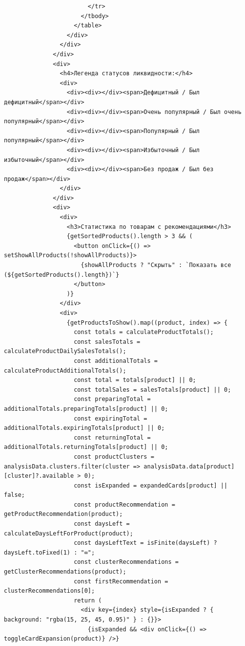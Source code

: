 \begin{code}
\begin{verbatim}
                        </tr>
                      </tbody>
                    </table>
                  </div>
                </div>
              </div>
              <div>
                <h4>Легенда статусов ликвидности:</h4>
                <div>
                  <div><div></div><span>Дефицитный / Был дефицитный</span></div>
                  <div><div></div><span>Очень популярный / Был очень популярный</span></div>
                  <div><div></div><span>Популярный / Был популярный</span></div>
                  <div><div></div><span>Избыточный / Был избыточный</span></div>
                  <div><div></div><span>Без продаж / Был без продаж</span></div>
                </div>
              </div>
              <div>
                <div>
                  <h3>Статистика по товарам с рекомендациями</h3>
                  {getSortedProducts().length > 3 && (
                    <button onClick={() => setShowAllProducts(!showAllProducts)}>
                      {showAllProducts ? "Скрыть" : `Показать все (${getSortedProducts().length})`}
                    </button>
                  )}
                </div>
                <div>
                  {getProductsToShow().map((product, index) => {
                    const totals = calculateProductTotals();
                    const salesTotals = calculateProductDailySalesTotals();
                    const additionalTotals = calculateProductAdditionalTotals();
                    const total = totals[product] || 0;
                    const totalSales = salesTotals[product] || 0;
                    const preparingTotal = additionalTotals.preparingTotals[product] || 0;
                    const expiringTotal = additionalTotals.expiringTotals[product] || 0;
                    const returningTotal = additionalTotals.returningTotals[product] || 0;
                    const productClusters = analysisData.clusters.filter(cluster => analysisData.data[product][cluster]?.available > 0);
                    const isExpanded = expandedCards[product] || false;
                    const productRecommendation = getProductRecommendation(product);
                    const daysLeft = calculateDaysLeftForProduct(product);
                    const daysLeftText = isFinite(daysLeft) ? daysLeft.toFixed(1) : "∞";
                    const clusterRecommendations = getClusterRecommendations(product);
                    const firstRecommendation = clusterRecommendations[0];
                    return (
                      <div key={index} style={isExpanded ? { background: "rgba(15, 25, 45, 0.95)" } : {}}>
                        {isExpanded && <div onClick={() => toggleCardExpansion(product)} />}

\end{verbatim}
\end{code}
